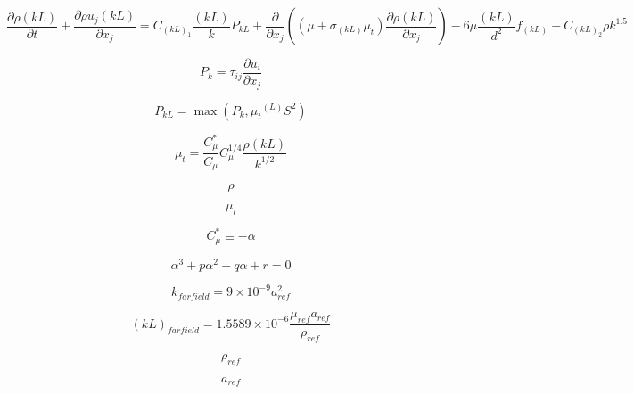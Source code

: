 \begin{equation}
\frac{{\partial \rho (kL)}}{{\partial t}} + \frac{{\partial \rho {u_j}(kL)}}{{\partial {x_j}}} 
   = {{C_{{(kL)}_{\scriptstyle 1}}}\frac{{(kL)}}{k}{P_{kL}} + 
   \frac{\partial }{{\partial {x_j}}}\left( {\left( {{\mu} + 
   {\sigma _{(kL)}}{\mu _t}} \right)\frac{{\partial \rho (kL)}}{{\partial {x_j}}}} \right) - 
   6{\mu}\frac{{(kL)}}{{{d^2}}}{f_{(kL)}}}
   - {C_{{(kL)}_{\scriptstyle 2}}}\rho {k^{1.5}}
\end{equation}
 
\begin{equation}
P_k = \tau_{ij} \frac{\partial u_i}{\partial x_j}
\end{equation}

\begin{equation}
P_{kL} = \max ({P_k},{\mu _t}^{(L)}{S^2})
\end{equation}

\begin{equation}
{\mu _t} = \frac{{C_\mu ^*}}{{{C_\mu }}}C_\mu ^{1/4}\frac{{\rho (kL)}}{{{k^{1/2}}}}
\end{equation}

\begin{equation}
\rho
\end{equation}

\begin{equation}
\mu_l
\end{equation}

\begin{equation}
C_{\mu}^* \equiv -\alpha
\end{equation}

\begin{equation}
\alpha^3 + p \alpha^2 + q \alpha + r = 0
\end{equation}

\begin{equation}
k_{farfield} = 9 \times 10^{-9} {a_{ref}^2}
\end{equation}

\begin{equation}
(kL)_{farfield} = 1.5589 \times 10^{-6} \frac{\mu_{ref} a_{ref}}{\rho_{ref}}
\end{equation}

\begin{equation}
\rho_{ref}
\end{equation}

\begin{equation}
a_{ref}
\end{equation}

